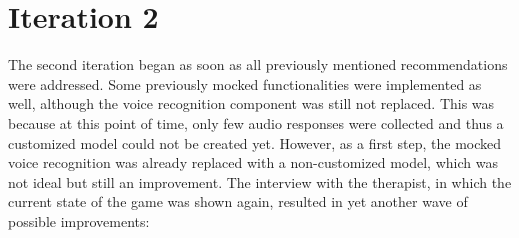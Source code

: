 \documentclass[draft,final]{vutinfth} %
\begin{document}
\section{Iteration 2}
The second iteration began as soon as all previously mentioned recommendations were addressed. Some previously mocked functionalities were implemented as well, although the voice recognition component was still not replaced. This was because at this point of time, only few audio responses were collected and thus a customized model could not be created yet. However, as a first step, the mocked voice recognition was already replaced with a non-customized model, which was not ideal but still an improvement. The interview with the therapist, in which the current state of the game was shown again, resulted in yet another wave of possible improvements:
\end{document}

